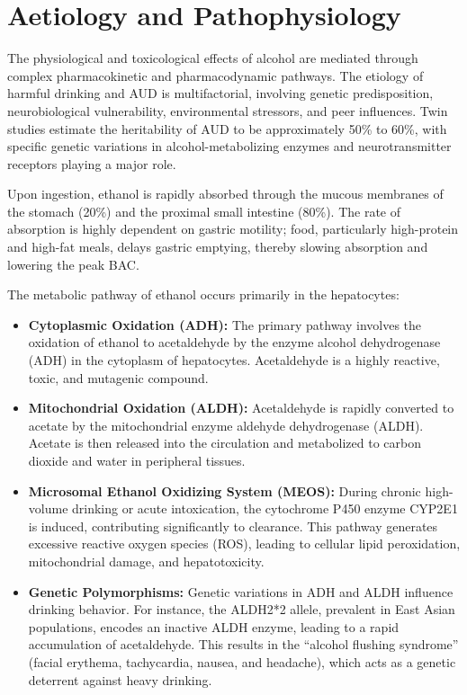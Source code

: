 \section*{Aetiology and Pathophysiology}
The physiological and toxicological effects of alcohol are mediated through complex pharmacokinetic and pharmacodynamic pathways. The etiology of harmful drinking and AUD is multifactorial, involving genetic predisposition, neurobiological vulnerability, environmental stressors, and peer influences. Twin studies estimate the heritability of AUD to be approximately 50\% to 60\%, with specific genetic variations in alcohol-metabolizing enzymes and neurotransmitter receptors playing a major role.

Upon ingestion, ethanol is rapidly absorbed through the mucous membranes of the stomach (20\%) and the proximal small intestine (80\%). The rate of absorption is highly dependent on gastric motility; food, particularly high-protein and high-fat meals, delays gastric emptying, thereby slowing absorption and lowering the peak BAC.

The metabolic pathway of ethanol occurs primarily in the hepatocytes:
\begin{itemize}
    \item \textbf{Cytoplasmic Oxidation (ADH):} The primary pathway involves the oxidation of ethanol to acetaldehyde by the enzyme alcohol dehydrogenase (ADH) in the cytoplasm of hepatocytes. Acetaldehyde is a highly reactive, toxic, and mutagenic compound.
    \item \textbf{Mitochondrial Oxidation (ALDH):} Acetaldehyde is rapidly converted to acetate by the mitochondrial enzyme aldehyde dehydrogenase (ALDH). Acetate is then released into the circulation and metabolized to carbon dioxide and water in peripheral tissues.
    \item \textbf{Microsomal Ethanol Oxidizing System (MEOS):} During chronic high-volume drinking or acute intoxication, the cytochrome P450 enzyme CYP2E1 is induced, contributing significantly to clearance. This pathway generates excessive reactive oxygen species (ROS), leading to cellular lipid peroxidation, mitochondrial damage, and hepatotoxicity.
    \item \textbf{Genetic Polymorphisms:} Genetic variations in ADH and ALDH influence drinking behavior. For instance, the ALDH2*2 allele, prevalent in East Asian populations, encodes an inactive ALDH enzyme, leading to a rapid accumulation of acetaldehyde. This results in the ``alcohol flushing syndrome'' (facial erythema, tachycardia, nausea, and headache), which acts as a genetic deterrent against heavy drinking.
\end{itemize}

